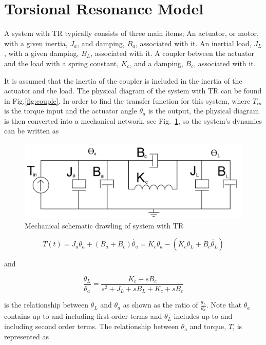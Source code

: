 \section{Torsional Resonance Model}\label{sec:trModel}
A system with TR typically consists of three main items;
An actuator, or motor, with a given inertia, $J_a$, and damping, $B_a$, associated with it.
An inertial load, $J_L$, with a given damping, $B_L$, associated with it.
A coupler between the actuator and the load with a spring constant, $K_c$, and a damping, $B_c$, associated with it.


It is assumed that the inertia of the coupler is included in the inertia of the actuator and the load. The physical diagram of the system with TR can be found in Fig.\ref{fig:couple}. In order to find the transfer function for this system, where $T_{in}$ is the torque input and the actuator angle $\theta_a$ is the output, the physical diagram is then converted into a mechanical network, see Fig.~\ref{fig:mech}, so the system's dynamics can be written as

\begin{figure}[h]
  \centering
\includegraphics[width=1.0\columnwidth]{./pix/mech.png}
  \caption{Mechanical schematic drawling of system with TR}
  \label{fig:mech}
\end{figure}

\begin{equation}
T(t) = J_a\ddot{\theta_a}+(B_a+B_c ) \dot{\theta_a}=K_c\theta_a-(K_c\theta_L+B_c\dot{\theta_L})
\end{equation}

and



\begin{equation}\label{eq:thetaLthetaa}
\frac{\theta_L}{\theta_a} = \frac{K_c+sB_c}{s^2+J_L+sB_L+K_c+sB_c}
\end{equation}

is the relationship between $\theta_L$ and $\theta_a$ as shown as the ratio of $\frac{\theta_L}{\theta_a}$. Note that $\theta_a$ contains up to and including first order terms and $\theta_L$ includes up to and including second order terms.  The relationship between $\theta_a$ and torque, $T$, is represented as



